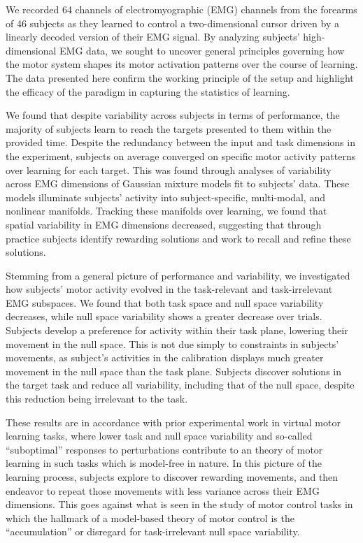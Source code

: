 \documentclass[../main.tex]{subfiles}
\begin{document}

We recorded 64 channels of electromyographic (EMG) channels from the forearms of 46 subjects as they learned to control a two-dimensional cursor driven by a linearly decoded version of their EMG signal. By analyzing subjects' high-dimensional EMG data, we sought to uncover general principles governing how the motor system shapes its motor activation patterns over the course of learning. The data presented here confirm the working principle of the setup and highlight the efficacy of the paradigm in capturing the statistics of learning.



We found that despite variability across subjects in terms of performance, the majority of subjects learn to reach the targets presented to them within the provided time. Despite the redundancy between the input and task dimensions in the experiment, subjects on average converged on specific motor activity patterns over learning for each target. This was found through analyses of variability across EMG dimensions of Gaussian mixture models fit to subjects' data. These models illuminate subjects' activity into subject-specific, multi-modal, and nonlinear manifolds. Tracking these manifolds over learning, we found that spatial variability in EMG dimensions decreased, suggesting that through practice subjects identify rewarding solutions and work to recall and refine these solutions. 


Stemming from a general picture of performance and variability, we investigated how subjects' motor activity evolved in the task-relevant and task-irrelevant EMG subspaces. We found that both task space and null space variability decreases, while null space variability shows a greater decrease over trials. Subjects develop a preference for activity within their task plane, lowering their movement in the null space. This is not due simply to constraints in subjects' movements, as subject's activities in the calibration displays much greater movement in the null space than the task plane. Subjects discover solutions in the target task and reduce all variability, including that of the null space, despite this reduction being irrelevant to the task.

These results are in accordance with prior experimental work in virtual motor learning tasks, where lower task and null space variability and so-called ``suboptimal'' responses to perturbations contribute to an theory of motor learning in such tasks which is model-free in nature\cite{MosierRemappingHandMovements2005,derugyMuscleCoordinationHabitual2012,BergerDifferencesInAdaptationRates2013a}. In this picture of the learning process, subjects explore to discover rewarding movements, and then endeavor to repeat those movements with less variance across their EMG dimensions. This goes against what is seen in the study of motor control tasks in which the hallmark of a model-based theory of motor control is the ``accumulation'' or disregard for task-irrelevant null space variability\cite{Valero-Cuevas2009}.
\end{document}

